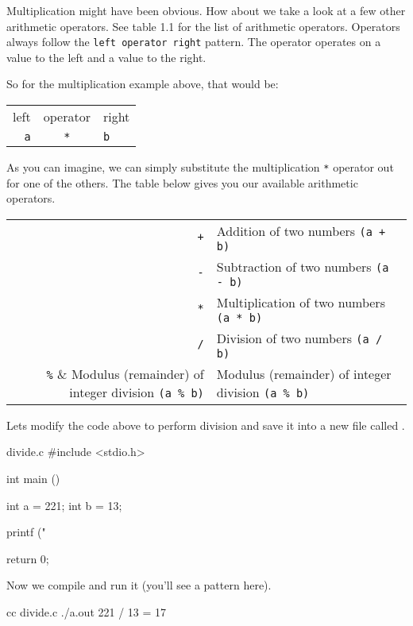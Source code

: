 Multiplication might have been obvious. How about we take a look at a few other
arithmetic operators. See table 1.1 for the list of arithmetic operators.
Operators always follow the \verb|left operator right| pattern. The operator
operates on a value to the left and a value to the right.

So for the multiplication example above, that would be:

\begin{center}
\begin{tabular}{r c l}
left & operator & right \\
\verb|a| & \verb|*| & \verb|b| \\
\end{tabular}
\end{center}

As you can imagine, we can simply substitute the multiplication \verb|*|
operator out for one of the others. The table below gives you our available
arithmetic operators.

\begin{center}
\begin{tabular}{r l}
\hline
\verb|+| & Addition of two numbers \verb|(a + b)| \\
\verb|-| & Subtraction of two numbers \verb|(a - b)| \\
\verb|*| & Multiplication of two numbers \verb|(a * b)| \\
\verb|/| & Division of two numbers \verb|(a / b)| \\
\verb|%| & Modulus (remainder) of integer division \verb|(a % b)| \\
\hline
\end{tabular}
\end{center}

Lets modify the code above to perform division and save it into a new file
called .

\begin{code}{divide.c}
#include <stdio.h>

int
main ()
{
    int a = 221;
    int b = 13;

    printf ("%

    return 0;
}
\end{code}

Now we compile  and run it (you'll see a pattern here).

\begin{Terminal}
cc divide.c
./a.out
221 / 13 = 17
\end{Terminal}

